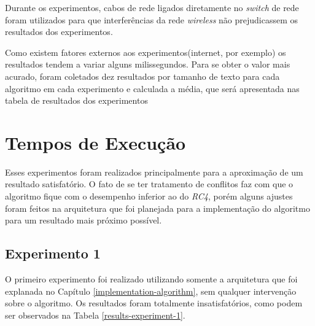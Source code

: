 Durante os experimentos, cabos de rede ligados diretamente no \textit{switch} de rede foram utilizados para que interferências da rede \textit{wireless} não prejudicassem os resultados dos experimentos. 

Como existem fatores externos aos experimentos(internet, por exemplo) os resultados tendem a variar alguns milissegundos. Para se obter o valor mais acurado, foram coletados dez resultados por tamanho de texto para cada algoritmo em cada experimento e calculada a média, que será apresentada nas tabela de resultados dos experimentos

\section{Tempos de Execução}

Esses experimentos foram realizados principalmente para a aproximação de um resultado satisfatório. O fato de se ter tratamento de conflitos faz com que o algoritmo fique com o desempenho inferior ao do \textit{RC4}, porém alguns ajustes foram feitos na arquitetura que foi planejada para a implementação do algoritmo para um resultado mais próximo possível.

\subsection{Experimento 1}

O primeiro experimento foi realizado utilizando somente a arquitetura que foi explanada no Capítulo \ref{implementation-algorithm}, sem qualquer intervenção sobre o algoritmo. Os resultados foram totalmente insatisfatórios, como podem ser observados na Tabela \ref{results-experiment-1}.


